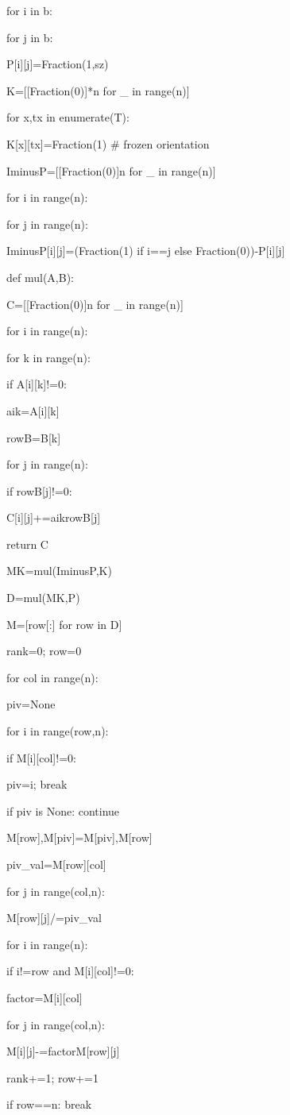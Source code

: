 for i in b:

for j in b:

P[i][j]=Fraction(1,sz)

K=[[Fraction(0)]*n for _ in range(n)]

for x,tx in enumerate(T):

K[x][tx]=Fraction(1)  # frozen orientation

IminusP=[[Fraction(0)]n for _ in range(n)]

for i in range(n):

for j in range(n):

IminusP[i][j]=(Fraction(1) if i==j else Fraction(0))-P[i][j]

def mul(A,B):

C=[[Fraction(0)]n for _ in range(n)]

for i in range(n):

for k in range(n):

if A[i][k]!=0:

aik=A[i][k]

rowB=B[k]

for j in range(n):

if rowB[j]!=0:

C[i][j]+=aikrowB[j]

return C

MK=mul(IminusP,K)

D=mul(MK,P)

M=[row[:] for row in D]

rank=0; row=0

for col in range(n):

piv=None

for i in range(row,n):

if M[i][col]!=0:

piv=i; break

if piv is None: continue

M[row],M[piv]=M[piv],M[row]

piv_val=M[row][col]

for j in range(col,n):

M[row][j]/=piv_val

for i in range(n):

if i!=row and M[i][col]!=0:

factor=M[i][col]

for j in range(col,n):

M[i][j]-=factorM[row][j]

rank+=1; row+=1

if row==n: break

